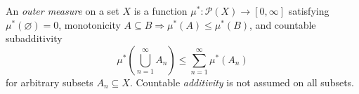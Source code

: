
An \emph{outer measure} on a set $X$ is a function $\mu^*:\mathcal P(X)\to[0,\infty]$ satisfying $\mu^*(\varnothing)=0$, monotonicity $A\subseteq B\Rightarrow\mu^*(A)\le\mu^*(B)$, and countable subadditivity
\[
\mu^*\left(\bigcup_{n=1}^\infty A_n\right)\le\sum_{n=1}^\infty\mu^*(A_n)
\]
for arbitrary subsets $A_n\subseteq X$. Countable \emph{additivity} is not assumed on all subsets.
